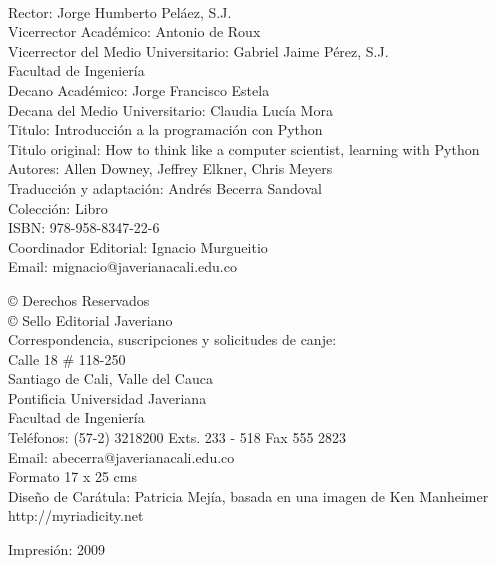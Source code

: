 \documentclass[letterpaper,twoside,10pt]{book}
\newcommand{\introprog}{Introducción a la programación con Python}
\begin{document}
\parindent0pt
{\tiny \ }

{\scriptsize 
Rector: Jorge Humberto Peláez, S.J.\\
Vicerrector Académico: Antonio de Roux\\
Vicerrector del Medio Universitario: Gabriel Jaime Pérez, S.J.\\

Facultad de Ingeniería\\
Decano Académico: Jorge Francisco Estela \\
Decana del Medio Universitario: Claudia Lucía Mora \\


Titulo:  \introprog \\
Titulo original: How to think like a computer scientist, learning with Python
Autores: Allen Downey, Jeffrey Elkner, Chris Meyers \\
Traducción y adaptación: Andrés Becerra Sandoval \\
Colección: Libro\\

ISBN: 978-958-8347-22-6 \\

Coordinador Editorial: Ignacio Murgueitio\\
Email: mignacio@javerianacali.edu.co

© Derechos Reservados\\
© Sello Editorial Javeriano\\

Correspondencia, suscripciones y solicitudes de canje:\\
Calle 18 \# 118-250\\
Santiago de Cali, Valle del Cauca\\
Pontificia Universidad Javeriana\\
Facultad de Ingeniería\\
Teléfonos: (57-2) 3218200 Exts. 233 - 518 Fax 555 2823\\
Email: abecerra@javerianacali.edu.co \\

Formato 17  x  25 cms\\

Diseño de Carátula: 
Patricia Mejía, basada en una imagen de Ken Manheimer \\
http://myriadicity.net

Impresión: 2009
}
\newpage
\thispagestyle{empty}
\vspace{0.25in}
\end{document}
